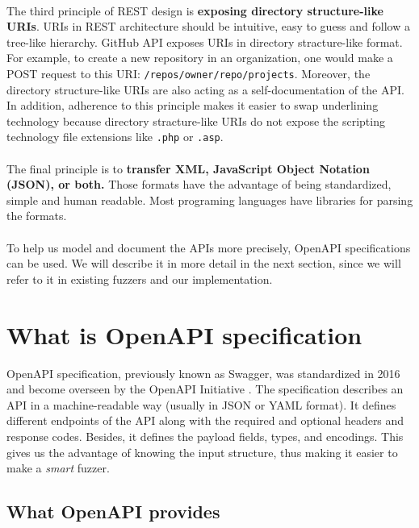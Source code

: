 \paragraph{}
The third principle of REST design is \textbf{exposing directory structure-like URIs}. URIs in REST architecture should be intuitive, easy to guess and follow a tree-like hierarchy. GitHub API exposes URIs in directory stracture-like format. For example, to create a new repository in an organization, one would make a POST request to this URI: \texttt{/repos/{owner}/{repo}/projects}. Moreover, the directory structure-like URIs are also acting as a self-documentation of the API. In addition, adherence to this principle makes it easier to swap underlining technology because directory stracture-like URIs do not expose the scripting technology file extensions like \texttt{.php} or \texttt{.asp}.

\paragraph{}
The final principle is to \textbf{transfer XML, JavaScript Object Notation (JSON), or both.} Those formats have the advantage of being standardized, simple and human readable. Most programing languages have libraries for parsing the formats.

\paragraph{}
To help us model and document the APIs more precisely, OpenAPI specifications can be used. We will describe it in more detail in the next section, since we will refer to it in existing fuzzers and our implementation.


\section{What is OpenAPI specification}
OpenAPI specification, previously known as Swagger, was standardized in 2016 and become overseen by the OpenAPI Initiative \cite{openapi2020main}. The specification describes an API in a machine-readable way (usually in JSON or YAML format). It defines different endpoints of the API along with the required and optional headers and response codes. Besides, it defines the payload fields, types, and encodings. This gives us the advantage of knowing the input structure, thus making it easier to make a \emph{smart} fuzzer.

\subsection{What OpenAPI provides}
